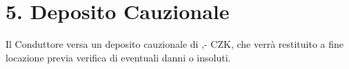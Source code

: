 \section*{5. Deposito Cauzionale}
Il Conduttore versa un deposito cauzionale di \DepositAmount,- CZK, che verrà restituito a fine locazione previa verifica di eventuali danni o insoluti.
